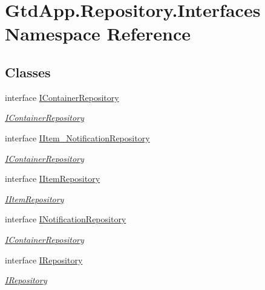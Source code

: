 \hypertarget{namespace_gtd_app_1_1_repository_1_1_interfaces}{}\section{Gtd\+App.\+Repository.\+Interfaces Namespace Reference}
\label{namespace_gtd_app_1_1_repository_1_1_interfaces}
\subsection*{Classes}
\begin{DoxyCompactItemize}
\item 
interface \mbox{\hyperlink{interface_gtd_app_1_1_repository_1_1_interfaces_1_1_i_container_repository}{I\+Container\+Repository}}
\begin{DoxyCompactList}\small\item\em \mbox{\hyperlink{interface_gtd_app_1_1_repository_1_1_interfaces_1_1_i_container_repository}{I\+Container\+Repository}} \end{DoxyCompactList}\item 
interface \mbox{\hyperlink{interface_gtd_app_1_1_repository_1_1_interfaces_1_1_i_item___notification_repository}{I\+Item\+\_\+\+Notification\+Repository}}
\begin{DoxyCompactList}\small\item\em \mbox{\hyperlink{interface_gtd_app_1_1_repository_1_1_interfaces_1_1_i_container_repository}{I\+Container\+Repository}} \end{DoxyCompactList}\item 
interface \mbox{\hyperlink{interface_gtd_app_1_1_repository_1_1_interfaces_1_1_i_item_repository}{I\+Item\+Repository}}
\begin{DoxyCompactList}\small\item\em \mbox{\hyperlink{interface_gtd_app_1_1_repository_1_1_interfaces_1_1_i_item_repository}{I\+Item\+Repository}} \end{DoxyCompactList}\item 
interface \mbox{\hyperlink{interface_gtd_app_1_1_repository_1_1_interfaces_1_1_i_notification_repository}{I\+Notification\+Repository}}
\begin{DoxyCompactList}\small\item\em \mbox{\hyperlink{interface_gtd_app_1_1_repository_1_1_interfaces_1_1_i_container_repository}{I\+Container\+Repository}} \end{DoxyCompactList}\item 
interface \mbox{\hyperlink{interface_gtd_app_1_1_repository_1_1_interfaces_1_1_i_repository}{I\+Repository}}
\begin{DoxyCompactList}\small\item\em \mbox{\hyperlink{interface_gtd_app_1_1_repository_1_1_interfaces_1_1_i_repository}{I\+Repository}} \end{DoxyCompactList}\end{DoxyCompactItemize}
